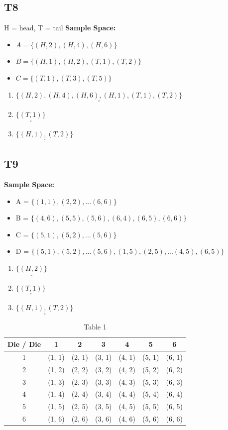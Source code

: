\documentclass[12pt, a4paper]{article}
\begin{document}
\subsection* {T8} 
H = head, T = tail
\textbf{Sample Space:}
\begin{itemize}
  \item $A = \{ (H, 2), (H, 4), (H, 6) \} $
  \item $B = \{ (H, 1), (H, 2), (T, 1), (T, 2) \} $
  \item $C = \{ (T, 1),  (T, 3), (T, 5) \} $
\end{itemize}
\begin{enumerate}
	\item $\underline{\underline{ \{ (H, 2), (H, 4), (H, 6), (H, 1), (T, 1), (T, 2) \} }}$
	\item $\underline{\underline{ \{ (T, 1) \} }}$
	\item $\underline{\underline{ \{ (H, 1), (T, 2) \} }}$
\end{enumerate}

\subsection* {T9} 
\textbf{Sample Space:}
\begin{itemize}
  \item A = $\{ (1, 1),  (2, 2),... (6, 6) \}   $
  \item B = $\{ (4, 6), (5, 5), (5, 6), (6, 4), (6, 5), (6, 6) \} $
  \item C = $\{ (5, 1),  (5, 2),... (5, 6) \} $
  \item D = $\{ (5, 1),  (5, 2),... (5, 6), (1, 5),  (2, 5),...(4, 5) , (6, 5) \} $
\end{itemize}
\begin{enumerate}
	\item $\underline{\underline{ \{ (H, 2) \} }}$
	\item $\underline{\underline{ \{ (T, 1) \} }}$
	\item $\underline{\underline{ \{ (H, 1), (T, 2) \} }}$
\end{enumerate}
\begin{table}[h]                %
  \centering
  \begin{tabular}{|c|c|c|c|c|c|c|}      %
    \hline
	  Die / Die & 1 & 2 & 3 & 4 & 5 & 6 \\
    \hline
	  1 & (1, 1) & (2, 1) & (3, 1) & (4, 1) & (5, 1) & (6, 1)\\
	  2 & (1, 2) & (2, 2) & (3, 2) & (4, 2) & (5, 2) & (6, 2) \\
	  3 & (1, 3) & (2, 3) & (3, 3) & (4, 3) & (5, 3) & (6, 3) \\
	  4 & (1, 4) & (2, 4) & (3, 4) & (4, 4) & (5, 4) & (6, 4) \\
	  5 & (1, 5) & (2, 5) & (3, 5) & (4, 5) & (5, 5) & (6, 5) \\
	  6 & (1, 6) & (2, 6) & (3, 6) & (4, 6) & (5, 6) & (6, 6) \\
    \hline
  \end{tabular}
  \caption{Table 1}
  \label{tab:mytable}
\end{table}


\end{document}
